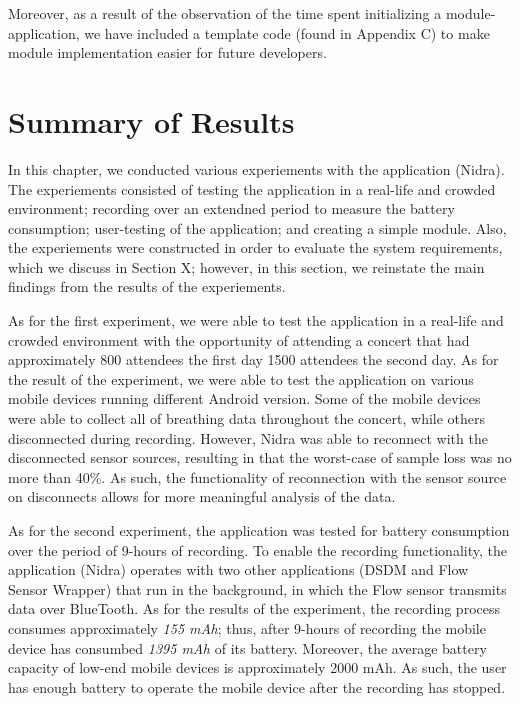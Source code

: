 Moreover, as a result of the observation of the time spent initializing a module-application, we have included a template code (found in Appendix C) to make module implementation easier for future developers. 




\section{Summary of Results}

In this chapter, we conducted various experiements with  the application (Nidra). The experiements consisted of testing the application in a real-life and crowded environment; recording over an extendned period to measure the battery consumption; user-testing of the application; and creating a simple module. Also, the experiements were constructed in order to evaluate the system requirements, which we discuss in Section X; however, in this section, we reinstate the main findings from the results of the experiements.

As for the first experiment, we were able to test the application in a real-life and crowded environment with the opportunity of attending a concert that had approximately 800 attendees the first day 1500 attendees the second day. As for the result of the experiment, we were able to test the application on various mobile devices running different Android version. Some of the mobile devices were able to collect all of breathing data throughout the concert, while others disconnected during recording. However, Nidra was able to reconnect with the disconnected sensor sources, resulting in that the worst-case of sample loss was no more than 40\%. As such, the functionality of reconnection with the sensor source on disconnects allows for more meaningful analysis of the data.

As for the second experiment, the application was tested for battery consumption over the period of 9-hours of recording. To enable the recording functionality, the application (Nidra) operates with two other applications (DSDM and Flow Sensor Wrapper) that run in the background, in which the Flow sensor transmits data over BlueTooth. As for the results of the experiment, the recording process consumes approximately \textit{155 mAh}; thus, after 9-hours of recording the mobile device has consumbed \textit{1395 mAh} of its battery. Moreover, the average battery capacity of low-end mobile devices is approximately 2000 mAh. As such, the user has enough battery to operate the mobile device after the recording has stopped. 

